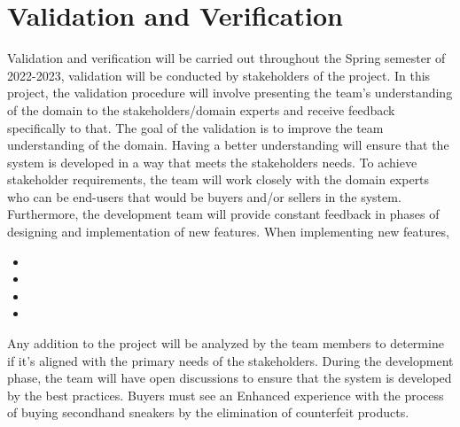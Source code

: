 \section{Validation and Verification}
\hspace{1cm} Validation and verification will be carried out throughout the Spring semester of 2022-2023, validation will be conducted by stakeholders of the project. In this project, the validation procedure will involve presenting the team’s understanding of the domain to the stakeholders/domain experts and receive feedback specifically to that. The goal of the validation is to improve the team understanding of the domain. Having a better understanding will ensure that the system is developed in a way that meets the stakeholders needs. To achieve stakeholder requirements, the team will work closely with the domain experts who can be end-users that would be buyers and/or sellers in the system. Furthermore, the development team will provide constant feedback in phases of designing and implementation of new features. When implementing new features, 
\begin{itemize}
  \item {}
  \item {}
  \item {}
  \item {}
\end{itemize}
Any addition to the project will be analyzed by the team members to determine if it’s aligned with the primary needs of the stakeholders. During the development phase, the team will have open discussions to ensure that the system is developed by the best practices. Buyers must see an Enhanced experience with the process of buying secondhand sneakers by the elimination of counterfeit products.
